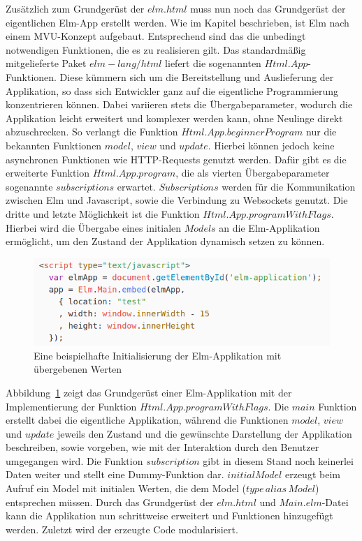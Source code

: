 Zusätzlich zum Grundgerüst der $elm.html$ muss nun noch das Grundgerüst der eigentlichen Elm-App erstellt werden. Wie im Kapitel  beschrieben, ist Elm nach einem \ac{MVU}-Konzept aufgebaut. Entsprechend sind das die unbedingt notwendigen Funktionen, die es zu realisieren gilt. Das standardmäßig mitgelieferte Paket $elm-lang/html$ liefert die sogenannten $Html.App$-Funktionen. Diese kümmern sich um die Bereitstellung und Auslieferung der Applikation, so dass sich Entwickler ganz auf die eigentliche Programmierung konzentrieren können. Dabei variieren stets die Übergabeparameter, wodurch die Applikation leicht erweitert und komplexer werden kann, ohne Neulinge direkt abzuschrecken. So verlangt die Funktion $Html.App.beginnerProgram$ nur die bekannten Funktionen $model$, $view$ und $update$. Hierbei können jedoch keine asynchronen Funktionen wie \ac{HTTP}-Requests genutzt werden.
Dafür gibt es die erweiterte Funktion $Html.App.program$, die als vierten Übergabeparameter sogenannte $subscriptions$ erwartet. $Subscriptions$ werden für die Kommunikation zwischen Elm und Javascript, sowie die Verbindung zu Websockets genutzt.
Die dritte und letzte Möglichkeit ist die Funktion $Html.App.programWithFlags$. Hierbei wird die Übergabe eines initialen $Models$ an die Elm-Applikation ermöglicht, um den Zustand der Applikation dynamisch setzen zu können.
\begin{figure}[ht]
\centering\includegraphics[scale=0.6]{img/programWithFlags_pass_data.png}
\caption{Eine beispielhafte Initialisierung der Elm-Applikation mit übergebenen Werten}\label{fig:programWithFlags}
\end{figure}
Abbildung~\ref{fig:programWithFlags} zeigt das Grundgerüst einer Elm-Applikation mit der Implementierung der Funktion $Html.App.programWithFlags$. Die $main$ Funktion erstellt dabei die eigentliche Applikation, während die Funktionen $model$, $view$ und $update$ jeweils den Zustand und die gewünschte Darstellung der Applikation beschreiben, sowie vorgeben, wie mit der Interaktion durch den Benutzer umgegangen wird. Die Funktion $subscription$ gibt in diesem Stand noch keinerlei Daten weiter und stellt eine Dummy-Funktion dar. $initialModel$ erzeugt beim Aufruf ein Model mit initialen Werten, die dem Model ($type\,alias\,Model$) entsprechen müssen. Durch das Grundgerüst der $elm.html$ und $Main.elm$-Datei kann die Applikation nun schrittweise erweitert und Funktionen hinzugefügt werden. Zuletzt wird der erzeugte Code modularisiert.

